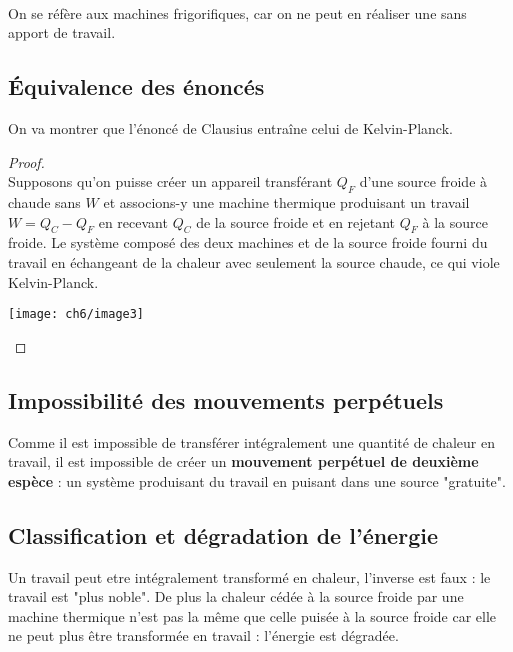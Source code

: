 	\ \\
	On se réfère aux machines frigorifiques, car on ne peut en 
	réaliser une sans apport de travail.
	
		\subsection{Équivalence des énoncés} 
		On va montrer que l'énoncé de Clausius entraîne celui de 
		Kelvin-Planck.
		
		\begin{proof}\ \\
		Supposons qu'on puisse créer un appareil transférant $Q_F$ 
		d'une source froide à chaude sans $W$ et associons-y une 
		machine thermique produisant un travail $W=Q_C-Q_F$ en 
		recevant $Q_C$ de la source froide et en rejetant $Q_F$ à la source froide. 
		Le système composé des deux machines et de la source 
		froide fourni du travail en échangeant de la chaleur avec 
		seulement la source chaude, ce qui viole Kelvin-Planck.
		
		\begin{center}
		\texttt{[image: ch6/image3]}
		\end{center}
		\end{proof}
		
		\subsection{Impossibilité des mouvements perpétuels}
		Comme il est impossible de transférer intégralement une 
		quantité de chaleur en travail, il est impossible de créer 
		un \textbf{mouvement perpétuel de deuxième espèce} : un 
		système produisant du travail en puisant dans une source 
		"gratuite".
		
		\subsection{Classification et dégradation de l'énergie}
		Un travail peut etre intégralement transformé en chaleur, 
		l'inverse est faux : le travail est "plus noble". De plus 
		la chaleur cédée à la source froide par une machine 
		thermique n'est pas la même que celle puisée à la source 
		froide car elle ne peut plus être transformée en travail : 
		l'énergie est dégradée.



